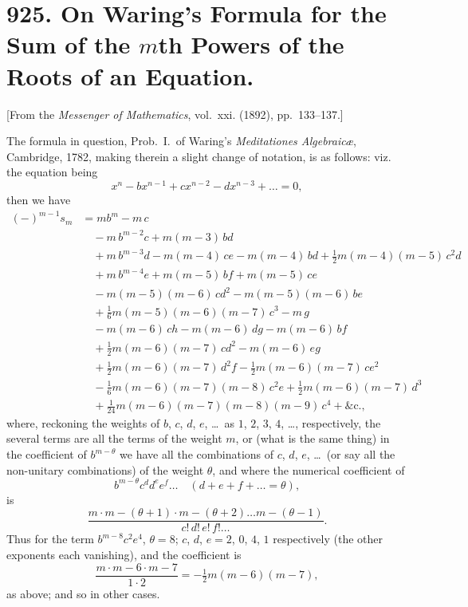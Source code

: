 \documentclass[12pt,a4paper]{article}
\begin{document}
\newpage
\section*{925. On Waring's Formula for the Sum of the $m$th Powers of the Roots of an Equation.}

[From the \textit{Messenger of Mathematics}, vol.~xxi. (1892), pp.~133--137.]

\bigskip

The formula in question, Prob.~I.~of Waring's \textit{Meditationes Algebraic\ae}, Cambridge,
1782, making therein a slight change of notation, is as follows: viz. the equation being
\[
x^n - bx^{n-1} + cx^{n-2} - dx^{n-3} + \ldots = 0,
\]
then we have
\begin{align*}
(-)^{m-1} s_m &= mb^m - m\,c\\
&\quad - m\,b^{m-2}c + m(m-3)\,bd\\
&\quad + m\,b^{m-3}d - m(m-4)\,ce - m(m-4)\,bd + \tfrac{1}{2}m(m-4)(m-5)\,c^2d\\
&\quad + m\,b^{m-4}e + m(m-5)\,bf + m(m-5)\,ce\\
&\quad - m(m-5)(m-6)\,cd^2 - m(m-5)(m-6)\,be\\
&\quad + \tfrac{1}{6}m(m-5)(m-6)(m-7)\,c^3 - m\,g\\
&\quad - m(m-6)\,ch - m(m-6)\,dg - m(m-6)\,bf\\
&\quad + \tfrac{1}{2}m(m-6)(m-7)\,cd^2 - m(m-6)\,eg\\
&\quad + \tfrac{1}{2}m(m-6)(m-7)\,d^2f - \tfrac{1}{2}m(m-6)(m-7)\,ce^2\\
&\quad - \tfrac{1}{6}m(m-6)(m-7)(m-8)\,c^2e + \tfrac{1}{2}m(m-6)(m-7)\,d^3\\
&\quad + \tfrac{1}{24}m(m-6)(m-7)(m-8)(m-9)\,c^4 + \&\text{c.},
\end{align*}
where, reckoning the weights of $b$, $c$, $d$, $e$, \ldots\ as $1$, $2$, $3$, $4$, \ldots, respectively, the several
terms are all the terms of the weight $m$, or (what is the same thing) in the
coefficient of $b^{m-\theta}$ we have all the combinations of $c$, $d$, $e$, \ldots\ (or say all the
non-unitary combinations) of the weight $\theta$, and where the numerical coefficient of
\[
b^{m-\theta} c^d d^e e^f \ldots \quad (d + e + f + \ldots = \theta),
\]
is
\[
\frac{m \cdot m - (\theta + 1) \cdot m - (\theta + 2) \ldots m - (\theta - 1)}{c!\,d!\,e!\,f!\ldots}.
\]
Thus for the term $b^{m-8}c^2e^4$, $\theta = 8$; $c$, $d$, $e = 2$, $0$, $4$, $1$ respectively (the other exponents
each vanishing), and the coefficient is
\[
\frac{m \cdot m-6 \cdot m-7}{1 \cdot 2} = -\tfrac{1}{2}m(m-6)(m-7),
\]
as above; and so in other cases.
\end{document}

